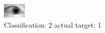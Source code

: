 \begin{figure}[h!]
\begin{center}
\includegraphics[width=0.60\columnwidth]{figures/ID1508_class_2_target_1.png}
\end{center}
\caption{ Classification: 2 actual target: 1}
\label{fig:ID1508_class_2_target_1}
\end{figure}
